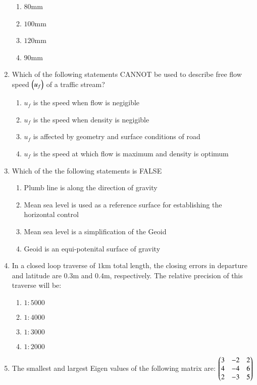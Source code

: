 \documentclass[journal]{IEEEtran}
\begin{document}
\begin{enumerate}
{\begin{multicols}{4}
\begin{enumerate}
\item $80$mm
\item $100$mm
\item $120$mm
\item $90$mm
\end{enumerate}
\end{multicols}
}
\item{
Which of the following statements CANNOT be used to describe free flow speed $\left(u_f\right)$ of a traffic stream? 
\begin{enumerate}
\item $u_f$ is the speed when flow is negigible
\item $u_f$ is the speed when density is negigible
\item $u_f$ is affected by geometry and surface conditions of road
\item $u_f$ is the speed at which flow is maximum and density is optimum
\end{enumerate}
}
\item{
Which of the the following statements is FALSE
\begin{enumerate}
\item Plumb line is along the direction of gravity
\item Mean sea level  is used as a reference surface for establishing the horizontal control
\item Mean sea level  is a simplification of the Geoid
\item Geoid is an equi-potenital surface of gravity
\end{enumerate}
}
\item{
In a closed loop traverse of $1$km total length, the closing errors in departure and latitude are $0.3$m and $0.4$m, respectively. The relative precision of this traverse will be: 
\begin{multicols}{4}
\begin{enumerate}
\item $1:5000$
\item $1:4000$
\item $1:3000$
\item $1:2000$
\end{enumerate}
\end{multicols}
}
\item{
The smallest and largest Eigen values of the following matrix are: $\begin{pmatrix}3&-2&2\\4&-4&6\\2&-3&5\end{pmatrix}$ 
}
\end{enumerate}
\end{document}
